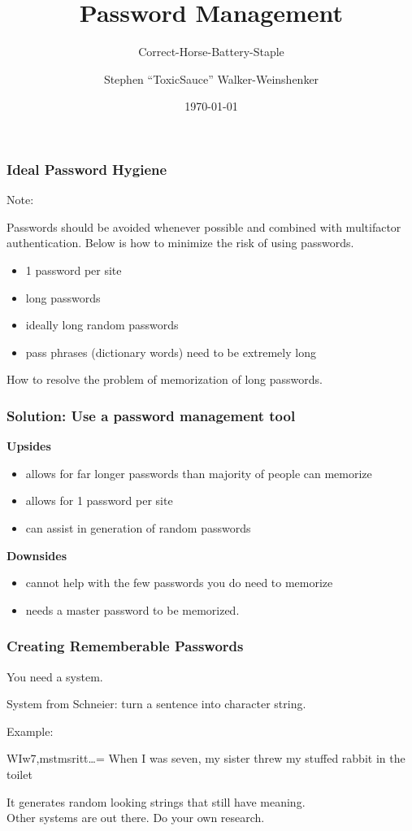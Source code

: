 \documentclass{beamer}
\title{Password Management}
\subtitle{Correct-Horse-Battery-Staple}
\author{Stephen ``ToxicSauce'' Walker-Weinshenker}
\institute{
  \inst{}
  Department of Computer Science\\
  Colorado State University
  \and
  \inst{}
  Department of Electrical and Computer Engineering\\
  Colorado State University
}
\date{\today}
\begin{document}
\frame{\titlepage}


\begin{frame}
  \frametitle{Ideal Password Hygiene}
  \begin{block}{Note:}

    Passwords should be avoided whenever possible and combined with multifactor
    authentication. Below is how to minimize the risk of using passwords.

  \end{block}
\begin{itemize}
  \item 1 password per site
  \item long passwords
  \item ideally long random passwords
  \item pass phrases (dictionary words) need to be extremely long
\end{itemize}
How to resolve the problem of memorization of long passwords.
\end{frame}

\begin{frame}
  \frametitle{Solution: Use a password management tool}
  \textbf{Upsides}
\begin{itemize}
  \item allows for far longer passwords than majority of people can memorize
  \item allows for 1 password per site
  \item can assist in generation of random passwords
\end{itemize}
\textbf{Downsides}
\begin{itemize}
  \item cannot help with the few passwords you do need to memorize
  \item needs a master password to be memorized.
\end{itemize}
\end{frame}

\begin{frame}
  \frametitle{Creating Rememberable Passwords}
  You need a system.

  System from Schneier: turn a sentence into character string.
  \begin{exampleblock}{Example:}

    WIw7,mstmsritt\ldots = When I was seven, my sister threw my stuffed rabbit
    in the toilet

  \end{exampleblock}

  It generates random looking strings that still have meaning.\\
  \vspace{8pt}
  Other systems are out there. Do your own research.

\end{frame}
\end{document}
